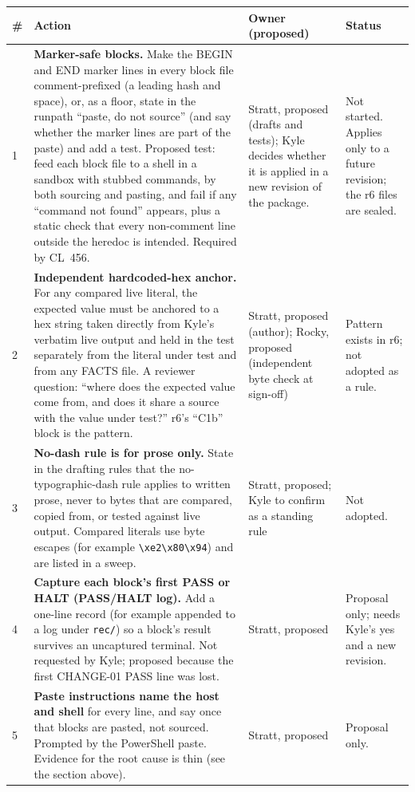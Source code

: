 \documentclass[10pt]{article}
\newcommand{\CL}[1]{CL~#1}
\newcommand{\dashesc}{\texttt{\textbackslash xe2\textbackslash x80\textbackslash x94}}
\begin{document}
\begin{longtable}{@{}L{0.3in}L{2.9in}L{1.6in}L{1.5in}@{}}
\toprule
\textbf{\#} & \textbf{Action} & \textbf{Owner (proposed)} & \textbf{Status} \\
\midrule
{} & \textbf{Marker-safe blocks.} Make the BEGIN and END marker lines in every block file comment-prefixed (a leading hash and space), or, as a floor, state in the runpath ``paste, do not source'' (and say whether the marker lines are part of the paste) and add a test. Proposed test: feed each block file to a shell in a sandbox with stubbed commands, by both sourcing and pasting, and fail if any ``command not found'' appears, plus a static check that every non-comment line outside the heredoc is intended. Required by \CL{456}. & Stratt, proposed (drafts and tests); Kyle decides whether it is applied in a new revision of the package. & Not started. Applies only to a future revision; the r6 files are sealed. \\
2 & \textbf{Independent hardcoded-hex anchor.} For any compared live literal, the expected value must be anchored to a hex string taken directly from Kyle's verbatim live output and held in the test separately from the literal under test and from any FACTS file. A reviewer question: ``where does the expected value come from, and does it share a source with the value under test?'' r6's ``C1b'' block is the pattern. & Stratt, proposed (author); Rocky, proposed (independent byte check at sign-off) & Pattern exists in r6; not adopted as a rule. \\
3 & \textbf{No-dash rule is for prose only.} State in the drafting rules that the no-typographic-dash rule applies to written prose, never to bytes that are compared, copied from, or tested against live output. Compared literals use byte escapes (for example \dashesc{}) and are listed in a sweep. & Stratt, proposed; Kyle to confirm as a standing rule & Not adopted. \\
4 & \textbf{Capture each block's first PASS or HALT (PASS/HALT log).} Add a one-line record (for example appended to a log under \texttt{rec/}) so a block's result survives an uncaptured terminal. Not requested by Kyle; proposed because the first CHANGE-01 PASS line was lost. & Stratt, proposed & Proposal only; needs Kyle's yes and a new revision. \\
5 & \textbf{Paste instructions name the host and shell} for every line, and say once that blocks are pasted, not sourced. Prompted by the PowerShell paste. Evidence for the root cause is thin (see the section above). & Stratt, proposed & Proposal only. \\
\bottomrule
\end{longtable}
\end{document}
